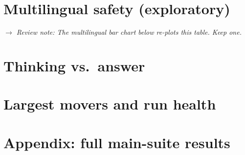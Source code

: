 \documentclass[10pt]{article}
\newcommand{\dupnote}[1]{\par\smallskip\noindent
  {\small\itshape$\rightarrow$ Review note: #1}\par\smallskip}
\begin{document}
\clearpage
\section*{Multilingual safety (exploratory)}

\dupnote{The multilingual bar chart below re-plots this table. Keep one.}


\clearpage
\section*{Thinking vs.\ answer}


\clearpage
\section*{Largest movers and run health}





\clearpage
\section*{Appendix: full main-suite results}

\end{document}
